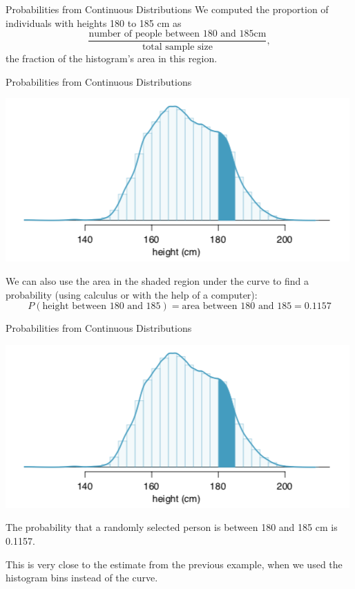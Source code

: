 \begin{frame}{Probabilities from Continuous Distributions}
    We computed the proportion of individuals with heights 180 to 185 cm as 
    \[
        \frac{\text{number of people between 180 and 185cm}}{\text{total sample size}},
    \]
    the fraction of the histogram’s area in this region. 
\end{frame}

\begin{frame}{Probabilities from Continuous Distributions}
    \begin{center}
        \includegraphics[scale=0.5]{images/shadedhistcurve.png}
    \end{center}
    We can also use the area in the shaded region under the curve to find a probability (using calculus or with the help of a computer):
    \[
        P(\text{height between }180\text{ and }185) = \text{area between }180\text{ and }185 = 0.1157
    \]
\end{frame}

\begin{frame}{Probabilities from Continuous Distributions}
    \begin{center}
        \includegraphics[scale=0.5]{images/shadedhistcurve.png}
    \end{center}

    The probability that a randomly selected person is between 180 and 185 cm is 0.1157. 
    
    \vspace{12pt}This is very close to the estimate from the previous example, when we used the histogram bins instead of the curve.
\end{frame}
